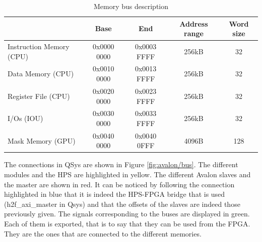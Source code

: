\begin{table}[H]
    \centering
    \begin{tabular}{|l|c|c|c|c|}
    \hline
    \rowcolor[HTML]{DAE8FC} 
    \multicolumn{1}{|c|}{\cellcolor[HTML]{DAE8FC}\textbf{Access}} & \textbf{Base} & \textbf{End} & \textbf{Address range} & \textbf{Word size} \\ \hline
    Instruction Memory (CPU)                                      & 0x0000 0000   & 0x0003 FFFF  & 256kB             & 32                 \\ \hline
    Data Memory (CPU)                                             & 0x0010 0000   & 0x0013 FFFF  & 256kB             & 32                 \\ \hline
    Register File (CPU)                                           & 0x0020 0000   & 0x0023 FFFF  & 256kB             & 32                 \\ \hline
    I/Os (IOU)                                                    & 0x0030 0000   & 0x0033 FFFF  & 256kB             & 32                 \\ \hline
    Mask Memory (GPU)                                             & 0x0040 0000   & 0x0040 0FFF  & 4096B             & 128                \\ \hline
    \end{tabular}
    \caption{Memory bus description}
    \label{mau/bus}
\end{table}

The connections in QSys are shown in Figure \ref{fig:avalon/bus}. 
The different modules and the HPS are highlighted in 
yellow. The different Avalon slaves and the master are shown in red. It can be noticed by following 
the connection highlighted in blue that it is indeed the HPS-FPGA bridge that is used 
(h2f\_axi\_master in Qsys) and that the offsets of the slaves are indeed those previously given. The 
signals corresponding to the buses are displayed in green. Each of them is exported, that is to say 
that they can be used from the FPGA. They are the ones that are connected to the different memories.

